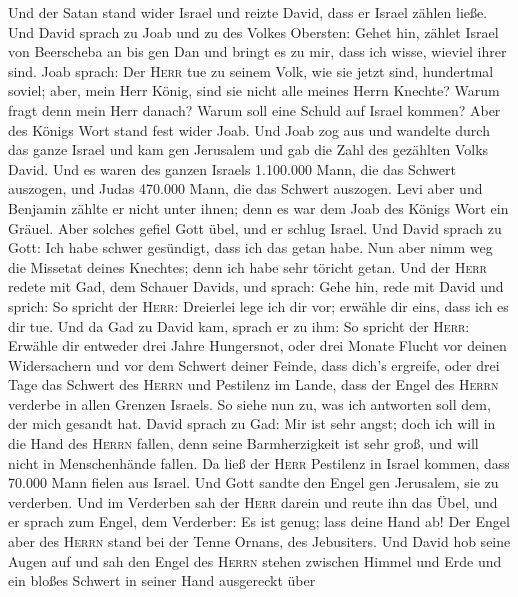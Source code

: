  Und der Satan stand wider Israel und reizte David, dass
er Israel zählen ließe.  Und David sprach zu Joab und zu
des Volkes Obersten: Gehet hin, zählet Israel von Beerscheba an bis gen
Dan und bringt es zu mir, dass ich wisse, wieviel ihrer sind.
 Joab sprach: Der \textsc{Herr} tue zu seinem Volk, wie
sie jetzt sind, hundertmal soviel; aber, mein Herr König, sind sie nicht
alle meines Herrn Knechte? Warum fragt denn mein Herr danach? Warum soll
eine Schuld auf Israel kommen?  Aber des Königs Wort stand
fest wider Joab. Und Joab zog aus und wandelte durch das ganze Israel
und kam gen Jerusalem  und gab die Zahl des gezählten
Volks David. Und es waren des ganzen Israels 1.100.000 Mann, die das
Schwert auszogen, und Judas 470.000 Mann, die das Schwert auszogen.
 Levi aber und Benjamin zählte er nicht unter ihnen; denn
es war dem Joab des Königs Wort ein Gräuel.  Aber solches
gefiel Gott übel, und er schlug Israel.  Und David sprach
zu Gott: Ich habe schwer gesündigt, dass ich das getan habe. Nun aber
nimm weg die Missetat deines Knechtes; denn ich habe sehr töricht getan.
 Und der \textsc{Herr} redete mit Gad, dem Schauer Davids,
und sprach:  Gehe hin, rede mit David und sprich: So
spricht der \textsc{Herr}: Dreierlei lege ich dir vor; erwähle dir eins,
dass ich es dir tue.  Und da Gad zu David kam, sprach er
zu ihm: So spricht der \textsc{Herr}: Erwähle dir 
entweder drei Jahre Hungersnot, oder drei Monate Flucht vor deinen
Widersachern und vor dem Schwert deiner Feinde, dass dich's ergreife,
oder drei Tage das Schwert des \textsc{Herrn} und Pestilenz im Lande,
dass der Engel des \textsc{Herrn} verderbe in allen Grenzen Israels. So
siehe nun zu, was ich antworten soll dem, der mich gesandt hat.
 David sprach zu Gad: Mir ist sehr angst; doch ich will
in die Hand des \textsc{Herrn} fallen, denn seine Barmherzigkeit ist
sehr groß, und will nicht in Menschenhände fallen.  Da
ließ der \textsc{Herr} Pestilenz in Israel kommen, dass 70.000 Mann
fielen aus Israel.  Und Gott sandte den Engel gen
Jerusalem, sie zu verderben. Und im Verderben sah der \textsc{Herr}
darein und reute ihn das Übel, und er sprach zum Engel, dem Verderber:
Es ist genug; lass deine Hand ab! Der Engel aber des \textsc{Herrn}
stand bei der Tenne Ornans, des Jebusiters.  Und David
hob seine Augen auf und sah den Engel des \textsc{Herrn} stehen zwischen
Himmel und Erde und ein bloßes Schwert in seiner Hand ausgereckt über
